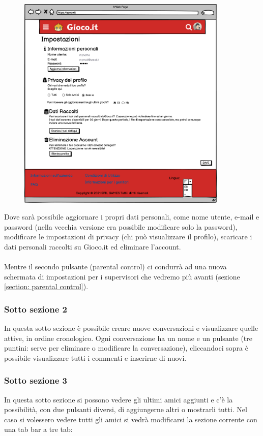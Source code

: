 \documentclass[../Report.tex]{subfiles}
\begin{document}
    \begin{figure}[H]
        \includegraphics[width=10cm]{WImpostazioni.png}
        \centering
    \end{figure}
    Dove sarà possibile aggiornare i propri dati personali, come nome utente, e-mail e password (nella vecchia versione era possibile modificare solo la password), modificare le impostazioni di privacy (chi può visualizzare il profilo), scaricare i dati personali raccolti su Gioco.it ed eliminare l'account.\\
    \\
    Mentre il secondo pulsante (parental control) ci condurrà ad una nuova schermata di impostazioni per i supervisori che vedremo più avanti (sezione \ref{section: parental control}).


    \subsubsection{Sotto sezione 2}
    In questa sotto sezione è possibile creare nuove conversazioni e visualizzare quelle attive, in ordine cronologico. Ogni conversazione ha un nome e un pulsante (tre puntini: serve per eliminare o modificare la conversazione), cliccandoci sopra è possibile visualizzare tutti i commenti e inserirne di nuovi.

    \subsubsection{Sotto sezione 3}
    In questa sotto sezione si possono vedere gli ultimi amici aggiunti e c'è la possibilità, con due pulsanti diversi, di aggiungerne altri o mostrarli tutti.
    Nel caso si volessero vedere tutti gli amici si vedrà modificarsi la sezione corrente con una tab bar a tre tab:
    
\end{document}
